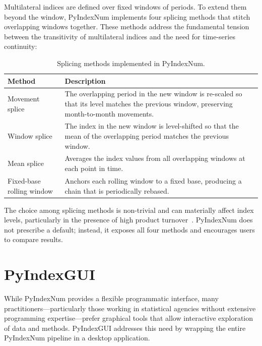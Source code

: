 \documentclass[12pt,a4paper]{article}
\begin{document}
Multilateral indices are defined over fixed windows of periods. To extend them beyond the window, PyIndexNum implements four splicing methods that stitch overlapping windows together. These methods address the fundamental tension between the transitivity of multilateral indices and the need for time-series continuity:

\begin{table}[h]
\centering
\caption{Splicing methods implemented in PyIndexNum.}
\label{tab:splicing}
\begin{tabular}{@{} l p{7.5cm} @{}}
\toprule
Method & Description \\
\midrule
Movement splice  & The overlapping period in the new window is re-scaled so that its level matches the previous window, preserving month-to-month movements. \\
Window splice    & The index in the new window is level-shifted so that the mean of the overlapping period matches the previous window. \\
Mean splice      & Averages the index values from all overlapping windows at each point in time. \\
Fixed-base rolling window & Anchors each rolling window to a fixed base, producing a chain that is periodically rebased. \\
\bottomrule
\end{tabular}
\end{table}

The choice among splicing methods is non-trivial and can materially affect index levels, particularly in the presence of high product turnover~\autocite{dehaan2010eliminating}. PyIndexNum does not prescribe a default; instead, it exposes all four methods and encourages users to compare results.

\section{PyIndexGUI}
\label{sec:gui}

While PyIndexNum provides a flexible programmatic interface, many practitioners---particularly those working in statistical agencies without extensive programming expertise---prefer graphical tools that allow interactive exploration of data and methods. PyIndexGUI addresses this need by wrapping the entire PyIndexNum pipeline in a desktop application.
\end{document}
